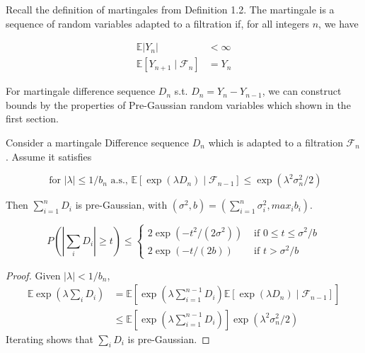 Recall the definition of martingales from Definition 1.2. The martingale is a sequence of random variables adapted to a filtration if, for all integers $n$, we have 

\begin{equation}
    \begin{aligned}
    \mathbb{E}\left|Y_{n}\right| &<\infty \\
    \mathbb{E}\left[Y_{n+1} \mid \mathcal{F}_{n}\right] &=Y_{n}
    \end{aligned}
\end{equation}

For martingale difference sequence $D_n$ s.t. $D_n = Y_{n} - Y_{n-1}$, we can construct bounds by the properties of Pre-Gaussian random variables which shown in the first section. 

\begin{theorem} \cite*{Bartlett:2020}
  Consider a martingale Difference sequence $D_n$ which is adapted to a filtration $\mathcal{F}_n$. 
  Assume it satisfies 

  \begin{equation}
    \text { for }|\lambda| \leq 1 / b_{n} \text { a.s., } \mathbb{E}\left[\exp \left(\lambda D_{n}\right) \mid \mathcal{F}_{n-1}\right] \leq \exp \left(\lambda^{2} \sigma_{n}^{2} / 2\right)
  \end{equation}

  Then $\sum_{i=1}^n D_i$ is pre-Gaussian, with $(\sigma^2, b) = (\sum_{i=1}^n \sigma_{i}^2, max_{i} b_i)$.

  \begin{equation}
    P\left(\left|\sum_{i} D_{i}\right| \geq t\right) \leq\left\{\begin{array}{ll}
    2 \exp \left(-t^{2} /\left(2 \sigma^{2}\right)\right) & \text { if } 0 \leq t \leq \sigma^{2} / b \\
    2 \exp (-t /(2 b)) & \text { if } t>\sigma^{2} / b
    \end{array}\right.
  \end{equation}
\end{theorem}

\begin{proof}
  Given $\left| \lambda \right| < 1/b_n$,
  \begin{equation}
    \begin{aligned}
    \mathbb{E} \exp \left(\lambda \sum_{i} D_{i}\right) &=\mathbb{E}\left[\exp \left(\lambda \sum_{i=1}^{n-1} D_{i}\right) \mathbb{E}\left[\exp \left(\lambda D_{n}\right) \mid \mathcal{F}_{n-1}\right]\right] \\
    & \leq \mathbb{E}\left[\exp \left(\lambda \sum_{i=1}^{n-1} D_{i}\right)\right] \exp \left(\lambda^{2} \sigma_{n}^{2} / 2\right)
    \end{aligned}
  \end{equation}
  Iterating shows that $\sum_i D_i$ is pre-Gaussian.
\end{proof}

